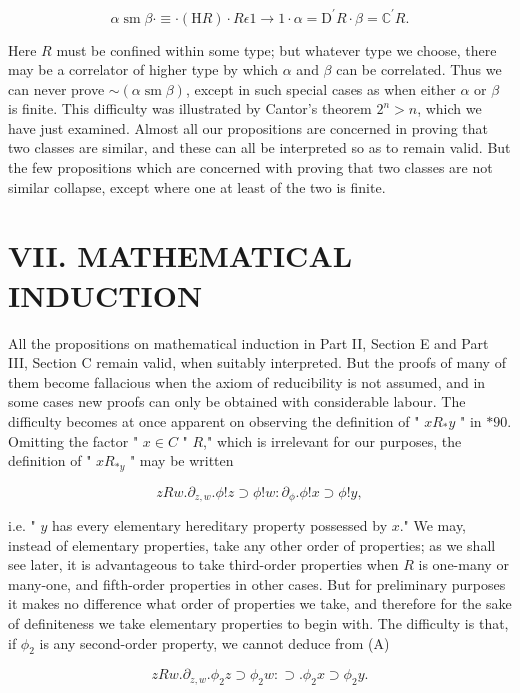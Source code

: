\documentclass[10pt]{article}
\begin{document}
$$
\alpha \operatorname{sm} \beta \cdot \equiv \cdot(\mathrm{H} R) \cdot R \epsilon 1 \rightarrow 1 \cdot \alpha=\mathrm{D}^{\prime} R \cdot \beta=\mathbb{C}^{\prime} R .
$$

Here $R$ must be confined within some type; but whatever type we choose, there may be a correlator of higher type by which $\alpha$ and $\beta$ can be correlated. Thus we can never prove $\sim(\alpha \operatorname{sm} \beta)$, except in such special cases as when either $\alpha$ or $\beta$ is finite. This difficulty was illustrated by Cantor's theorem $2^{n}>n$, which we have just examined. Almost all our propositions are concerned in proving that two classes are similar, and these can all be interpreted so as to remain valid. But the few propositions which are concerned with proving that two classes are not similar collapse, except where one at least of the two is finite.

\section*{VII. MATHEMATICAL INDUCTION}
All the propositions on mathematical induction in Part II, Section E and Part III, Section C remain valid, when suitably interpreted. But the proofs of many of them become fallacious when the axiom of reducibility is not assumed, and in some cases new proofs can only be obtained with considerable labour. The difficulty becomes at once apparent on observing the definition of " $x R_{*} y$ " in $* 90$. Omitting the factor " $x \in C$ " $R$," which is irrelevant for our purposes, the definition of " $x R_{* y}$ " may be written


\begin{equation*}
z R w . \partial_{z, w} . \phi!z \supset \phi!w: \partial_{\phi} . \phi!x \supset \phi!y, \tag{A}
\end{equation*}


i.e. " $y$ has every elementary hereditary property possessed by $x$." We may, instead of elementary properties, take any other order of properties; as we shall see later, it is advantageous to take third-order properties when $R$ is one-many or many-one, and fifth-order properties in other cases. But for preliminary purposes it makes no difference what order of properties we take, and therefore for the sake of definiteness we take elementary properties to begin with. The difficulty is that, if $\phi_{2}$ is any second-order property, we cannot deduce from (A)


\begin{equation*}
z R w . \partial_{z, w} . \phi_{2} z \supset \phi_{2} w: \supset . \phi_{2} x \supset \phi_{2} y . \tag{B}
\end{equation*}
\end{document}
